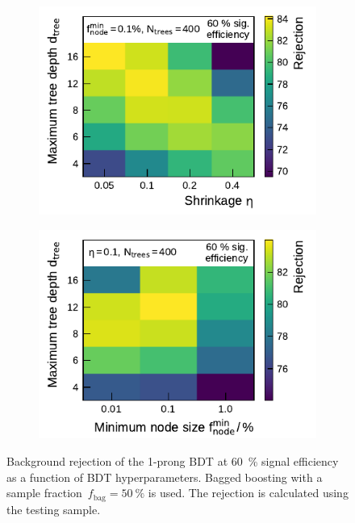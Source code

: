 \begin{figure}[htb]
\begin{subfigure}[t]{0.48\textwidth}
    \includegraphics{./figures/bdt_perf/gridsearch_1p/scan_Shrinkage_MaxDepth.pdf}
    \vspace*{-1.6em}
    \subcaption{}
    \label{fig:gridscan_shrinkage_maxdepth}
  \end{subfigure}\hfill
  \begin{subfigure}[t]{0.48\textwidth}
    \centering
    \includegraphics{./figures/bdt_perf/gridsearch_1p/scan_MinNodeSize_MaxDepth.pdf}
    \vspace*{-1.6em}
    \subcaption{}
    \label{fig:gridscan_minnodesize_maxdepth}
  \end{subfigure}
  \vspace*{-0.3em}
  \caption[Background rejection as a function of BDT hyperparameters
  (1-prong)]{Background rejection of the 1-prong BDT at \SI{60}{\percent} signal
    efficiency as a function of BDT hyperparameters. Bagged boosting with a
    sample fraction~$f_\text{bag} = \SI{50}{\percent}$ is used. The rejection is
    calculated using the testing sample.}
  \label{fig:hyperparameter_scan_1p}
\end{figure}

